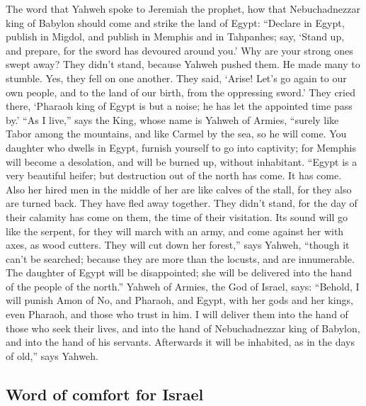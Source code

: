 \begin{paracol}{2}
\begin{otherlanguage}{english}
 The word that Yahweh spoke to Jeremiah the prophet, how
that Nebuchadnezzar king of Babylon should come and strike the land of
Egypt:  ``Declare in Egypt, publish in Migdol, and
publish in Memphis and in Tahpanhes; say, `Stand up, and prepare, for
the sword has devoured around you.'  Why are your strong
ones swept away? They didn't stand, because Yahweh pushed them.
 He made many to stumble. Yes, they fell on one another.
They said, `Arise! Let's go again to our own people, and to the land of
our birth, from the oppressing sword.'  They cried there,
`Pharaoh king of Egypt is but a noise; he has let the appointed time
pass by.'  ``As I live,'' says the King, whose name is
Yahweh of Armies, ``surely like Tabor among the mountains, and like
Carmel by the sea, so he will come.  You daughter who
dwells in Egypt, furnish yourself to go into captivity; for Memphis will
become a desolation, and will be burned up, without inhabitant.
 ``Egypt is a very beautiful heifer; but destruction out
of the north has come. It has come.  Also her hired men
in the middle of her are like calves of the stall, for they also are
turned back. They have fled away together. They didn't stand, for the
day of their calamity has come on them, the time of their visitation.
 Its sound will go like the serpent, for they will march
with an army, and come against her with axes, as wood cutters.
 They will cut down her forest,'' says Yahweh, ``though
it can't be searched; because they are more than the locusts, and are
innumerable.  The daughter of Egypt will be disappointed;
she will be delivered into the hand of the people of the north.''
 Yahweh of Armies, the God of Israel, says: ``Behold, I
will punish Amon of No, and Pharaoh, and Egypt, with her gods and her
kings, even Pharaoh, and those who trust in him.  I will
deliver them into the hand of those who seek their lives, and into the
hand of Nebuchadnezzar king of Babylon, and into the hand of his
servants. Afterwards it will be inhabited, as in the days of old,'' says
Yahweh.

\hypertarget{word-of-comfort-for-israel}{%
\subsection{Word of comfort for
Israel}\label{word-of-comfort-for-israel}}


\end{otherlanguage}
\end{paracol}
